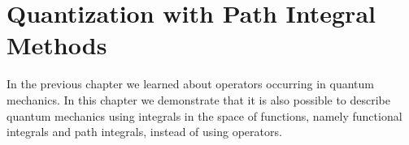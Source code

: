 
\chapter{Quantization with Path Integral Methods}

In the previous chapter we learned about operators occurring in quantum mechanics. In this chapter we demonstrate that it is also possible to describe quantum mechanics using integrals in the space of functions, namely functional integrals and path integrals, instead of using operators. 